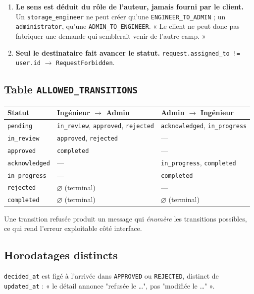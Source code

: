 \documentclass[11pt,a4paper]{report}
\newcommand{\fn}[1]{\texttt{\small\textcolor{oasisviolet}{#1}}}
\newcommand{\cls}[1]{\texttt{\small\textcolor{oasisblue}{#1}}}
\newcommand{\arrowto}{\ensuremath{\rightarrow}}
\begin{document}
\begin{enumerate}
  \item \textbf{Le sens est déduit du rôle de l'auteur, jamais fourni par le
  client.} Un \texttt{storage\_engineer} ne peut créer qu'une
  \texttt{ENGINEER\_TO\_ADMIN} ; un \texttt{administrator}, qu'une
  \texttt{ADMIN\_TO\_ENGINEER}. « Le client ne peut donc pas fabriquer une
  demande qui semblerait venir de l'autre camp. »
  \item \textbf{Seul le destinataire fait avancer le statut.}
  \texttt{request.assigned\_to != user.id} \arrowto{} \cls{RequestForbidden}.
\end{enumerate}

\subsection*{Table \fn{ALLOWED\_TRANSITIONS}}

\begin{longtable}{@{}p{3.0cm}p{5.4cm}p{6.2cm}@{}}
\toprule
\textbf{Statut} & \textbf{Ingénieur \arrowto{} Admin} & \textbf{Admin \arrowto{} Ingénieur}\\
\midrule
\endhead
\texttt{pending} & \texttt{in\_review}, \texttt{approved}, \texttt{rejected} & \texttt{acknowledged}, \texttt{in\_progress}\\
\texttt{in\_review} & \texttt{approved}, \texttt{rejected} & ---\\
\texttt{approved} & \texttt{completed} & ---\\
\texttt{acknowledged} & --- & \texttt{in\_progress}, \texttt{completed}\\
\texttt{in\_progress} & --- & \texttt{completed}\\
\texttt{rejected} & \(\varnothing\) (terminal) & ---\\
\texttt{completed} & \(\varnothing\) (terminal) & \(\varnothing\) (terminal)\\
\bottomrule
\end{longtable}

\noindent
Une transition refusée produit un message qui \emph{énumère} les transitions
possibles, ce qui rend l'erreur exploitable côté interface.

\subsection*{Horodatages distincts}
\texttt{decided\_at} est figé à l'arrivée dans \texttt{APPROVED} ou
\texttt{REJECTED}, distinct de \texttt{updated\_at} : « le détail annonce
"refusée le \ldots", pas "modifiée le \ldots" ».
\end{document}
